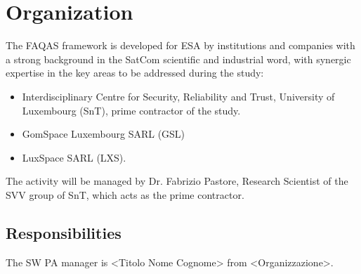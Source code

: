 \chapter{Organization}
\label{chapter:organization}

The FAQAS framework is developed for ESA by institutions and companies with a strong background in the SatCom
scientific and industrial word, with synergic expertise in the key areas to be addressed during
the study:
\begin{itemize}
  \item Interdisciplinary Centre for Security, Reliability and Trust, University of Luxembourg (SnT), prime contractor of the study.
  \item GomSpace Luxembourg SARL (GSL)
  \item LuxSpace SARL (LXS).
\end{itemize}

The activity will be managed by Dr. Fabrizio Pastore, Research Scientist of the SVV group of SnT, which acts as the prime contractor.

\section{Responsibilities}
\label{sec:resp}


The SW PA manager is <Titolo Nome Cognome> from <Organizzazione>.
